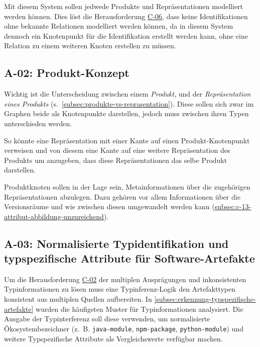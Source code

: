 Mit diesem System sollen jedwede Produkte und Repräsentationen modelliert werden können.
Dies löst die Herausforderung \hyperref[subsec:c-06-falle-ohne-aktion-konnen-nicht-dokumentiert-werden]{C-06}, dass keine Identifikationen ohne bekannte Relationen modelliert werden können, da in diesem System dennoch ein Knotenpunkt für die Identifikation erstellt werden kann, ohne eine Relation zu einem weiteren Knoten erstellen zu müssen.

\subsection{A-02: Produkt-Konzept}\label{subsec:req-product-concept}

Wichtig ist die Unterscheidung zwischen einem \textit{Produkt}, und der \textit{Repräsentation eines Produkts} (s.\ \autoref{subsec:produkte-vs-reprasentation}).
Diese sollen sich zwar im Graphen beide als Knotenpunkte darstellen, jedoch muss zwischen ihren Typen unterschieden werden.

So könnte eine Repräsentation mit einer Kante auf einen Produkt-Knotenpunkt verweisen und von diesem eine Kante auf eine weitere Repräsentation des Produkts um anzugeben, dass diese Repräsentationen das selbe Produkt darstellen.

Produktknoten sollen in der Lage sein, Metainformationen über die zugehörigen Repräsentationen abzulegen.
Dazu gehören vor allem Informationen über die Versionsräume und wie zwischen diesen umgewandelt werden kann (\hyperref[C-13]{subsec:c-13-attribut-abbildung-unzureichend}).

\subsection{A-03: Normalisierte Typidentifikation und typspezifische Attribute für Software-Artefakte}\label{subsec:req-type-specific-matching}

Um die Herausforderung \hyperref[subsec:c-02-uneindeutige-artefakt-typinformation]{C-02} der multiplen Ausprägungen und inkonsistenten Typinformationen zu lösen muss eine Typinferenz-Logik den Artefakttypen konsistent aus multiplen Quellen aufbereiten.
In \autoref{subsec:erkennung-typspezifische-artefakte} wurden die häufigsten Muster für Typinformationen analysiert.
Die Ausgabe der Typinterferenz soll diese verwenden, um normalisierte Ökosystembezeichner (z.\ B. \texttt{java-module}, \texttt{npm-package}, \texttt{python-module}) und weitere Typspezifische Attribute als Vergleichswerte verfügbar machen.

